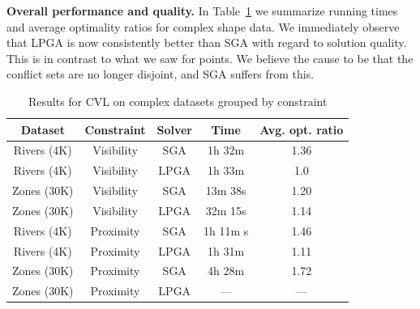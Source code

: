 \documentclass[11pt, oneside]{report}
\newcommand{\minisec}[1]{\noindent\textbf{#1.}}
\begin{document}
{\minisec{Overall performance and quality}
In Table~\ref{tab:complex:overview} we summarize running times and average optimality ratios for complex shape data. We immediately observe that LPGA is now consistently better than SGA with regard to solution quality. This is in contrast to what we saw for points. We believe the cause to be that the conflict sets are no longer disjoint, and SGA suffers from this.

\begin{table}[htdp]
\caption{Results for CVL on complex datasets grouped by constraint}
\begin{center}
\begin{tabular}{|c|c|c|c|c|}
\hline
\textbf{Dataset} & \textbf{Constraint} & \textbf{Solver} & \textbf{Time} & \textbf{Avg. opt. ratio}\\ 
\hline
Rivers (4K) & Visibility & SGA & 1h 32m & 1.36 \\
Rivers (4K) & Visibility & LPGA & 1h 33m & 1.0 \\
Zones (30K) & Visibility & SGA & 13m 38s & 1.20 \\
Zones (30K) & Visibility & LPGA & 32m 15s & 1.14 \\
\hline
Rivers (4K)  & Proximity  & SGA& 1h 11m s & 1.46 \\
Rivers (4K)  & Proximity & LPGA & 1h 31m & 1.11 \\
Zones (30K) & Proximity & SGA & 4h 28m & 1.72 \\
Zones (30K) & Proximity & LPGA & --- & --- \\
\hline
\end{tabular}
\end{center}
\label{tab:complex:overview}
\end{table}%

}
\end{document}
